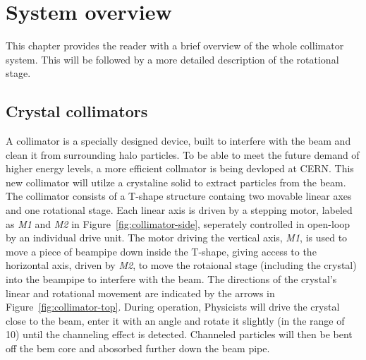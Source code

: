 \chapter{System overview}\label{cha:systemOverview}

This chapter provides the reader with a brief overview of the whole collimator system. This will be followed by a more detailed description of the rotational stage.

\section{Crystal collimators}
A collimator is a specially designed device, built to interfere with the beam and clean it from surrounding halo particles. To be able to meet the future demand of higher energy levels, a more efficient collmator is being devloped at CERN. This new collimator will utilze a crystaline solid to extract particles from the beam. The collimator consists of a T-shape structure containg two movable linear axes and one rotational stage. Each linear axis is driven by a stepping motor, labeled as \emph{M1} and \emph{M2} in Figure~\ref{fig:collimator-side}, seperately controlled in open-loop by an individual drive unit. The motor driving the vertical axis, \emph{M1}, is used to move a piece of beampipe down inside the T-shape, giving access to the horizontal axis, driven by \emph{M2}, to move the rotaional stage (including the crystal) into the beampipe to interfere with the beam. The directions of the crystal's linear and rotational movement are indicated by the arrows in Figure~\ref{fig:collimator-top}.
During operation, Physicists will drive the crystal close to the beam, enter it with an angle and rotate it slightly (in the range of \unit{10}{\milli\rad}) until the channeling effect is detected. Channeled particles will then be bent off the bem core and abosorbed further down the beam pipe.

